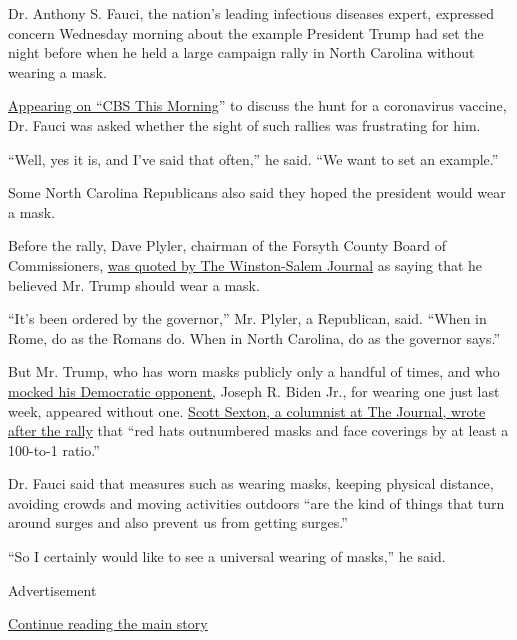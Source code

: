 Dr. Anthony S. Fauci, the nation's leading infectious diseases expert,
expressed concern Wednesday morning about the example President Trump
had set the night before when he held a large campaign rally in North
Carolina without wearing a mask.

\href{https://www.cbsnews.com/video/dr-anthony-fauci-on-the-race-for-a-covid-19-vaccine/\#x}{Appearing
on ``CBS This Morning}'' to discuss the hunt for a coronavirus vaccine,
Dr. Fauci was asked whether the sight of such rallies was frustrating
for him.

``Well, yes it is, and I've said that often,'' he said. ``We want to set
an example.''

Some North Carolina Republicans also said they hoped the president would
wear a mask.

Before the rally, Dave Plyler, chairman of the Forsyth County Board of
Commissioners,
\href{https://journalnow.com/news/local/president-trump-should-wear-a-mask-during-his-visit-to-winston-salem-county-republican-says/article_551be240-ee3c-11ea-aaac-07490e3d44da.html\#1}{was
quoted by The Winston-Salem Journal} as saying that he believed Mr.
Trump should wear a mask.

``It's been ordered by the governor,'' Mr. Plyler, a Republican, said.
``When in Rome, do as the Romans do. When in North Carolina, do as the
governor says.''

But Mr. Trump, who has worn masks publicly only a handful of times, and
who
\href{https://www.nytimes3xbfgragh.onion/live/2020/09/03/us/trump-vs-biden\#at-a-latrobe-pa-rally-trump-boasts-of-getting-along-with-russia}{mocked
his Democratic opponent,} Joseph R. Biden Jr., for wearing one just last
week, appeared without one.
\href{https://journalnow.com/news/columnists/red-hats-outnumber-masks-100-to-1-at-trump-rally-in-winston-salem/article_68b65640-f239-11ea-be2c-ab2e9b586707.html}{Scott
Sexton, a columnist at The Journal, wrote after the rally} that ``red
hats outnumbered masks and face coverings by at least a 100-to-1
ratio.''

Dr. Fauci said that measures such as wearing masks, keeping physical
distance, avoiding crowds and moving activities outdoors ``are the kind
of things that turn around surges and also prevent us from getting
surges.''

``So I certainly would like to see a universal wearing of masks,'' he
said.

Advertisement

\protect\hyperlink{after-bottom}{Continue reading the main story}

